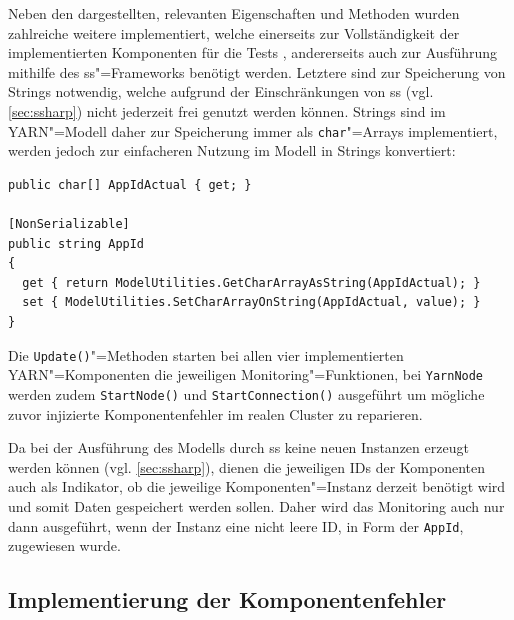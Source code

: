 Neben den dargestellten, relevanten Eigenschaften und Methoden wurden zahlreiche weitere implementiert, welche einerseits zur Vollständigkeit der implementierten Komponenten für die Tests \cite{Eberhardinger2018}, andererseits auch zur Ausführung mithilfe des \gls{ss}"=Frameworks benötigt werden.
Letztere sind \zB zur Speicherung von Strings notwendig, welche aufgrund der Einschränkungen von \gls{ss} (vgl. \cref{sec:ssharp}) \uU nicht jederzeit frei genutzt werden können.
Strings sind im YARN"=Modell daher zur Speicherung immer als  \texttt{char}"=Arrays implementiert, werden jedoch zur einfacheren Nutzung im Modell in Strings konvertiert:

\begin{lstlisting}[label=lst:modelCharArrayAsString,style=cs,
caption={[Implementierung der Eigenschaft AppId]
    Implementierung der Eigenschaft \texttt{AppId}.
    Die beiden Methoden \texttt{GetCharArrayAsString} und \texttt{SetCharArrayOnString} führen die Konvertierung in den \texttt{char}"=Array bzw. des \texttt{char}"=Arrays in einen String durch.
    Das Attribut \texttt{NonSerializable} definiert, dass die Eigenschaft bei der Ausführung der Simulation von \acrshort{ss} ignoriert wird.}]
public char[] AppIdActual { get; }

[NonSerializable]
public string AppId
{
  get { return ModelUtilities.GetCharArrayAsString(AppIdActual); }
  set { ModelUtilities.SetCharArrayOnString(AppIdActual, value); }
}
\end{lstlisting}

Die \texttt{Update()}"=Methoden starten bei allen vier implementierten YARN"=Komponenten die jeweiligen Monitoring"=Funktionen, bei \texttt{YarnNode} werden zudem \texttt{StartNode()} und \texttt{StartConnection()} ausgeführt um mögliche zuvor injizierte Komponentenfehler im realen Cluster zu reparieren.

Da bei der Ausführung des Modells durch \gls{ss} keine neuen Instanzen erzeugt werden können (vgl. \cref{sec:ssharp}), dienen die jeweiligen IDs der Komponenten auch als Indikator, ob die jeweilige Komponenten"=Instanz derzeit benötigt wird und somit Daten gespeichert werden sollen.
Daher wird das Monitoring auch nur dann ausgeführt, wenn der Instanz eine nicht leere ID, \zB in Form der \texttt{AppId}, zugewiesen wurde.

\subsection{Implementierung der Komponentenfehler}
\label{subsec:yarnComponentFaults}

